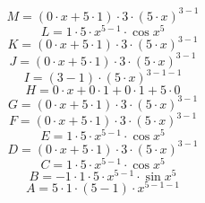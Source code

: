 \documentclass[12pt]{article}
\begin{document}
\begin{equation}
	M = 
\left( 0\cdot x + 5\cdot 1\right) \cdot 3\cdot \left( 5\cdot x\right) ^{3 - 1}
\end{equation}
\begin{equation}
	L = 
1\cdot 5\cdot x^{5 - 1}\cdot \cos {x^{5}}
\end{equation}
\begin{equation}
	K = 
\left( 0\cdot x + 5\cdot 1\right) \cdot 3\cdot \left( 5\cdot x\right) ^{3 - 1}
\end{equation}
\begin{equation}
	J = 
\left( 0\cdot x + 5\cdot 1\right) \cdot 3\cdot \left( 5\cdot x\right) ^{3 - 1}
\end{equation}
\begin{equation}
	I = 
\left( 3 - 1\right) \cdot \left( 5\cdot x\right) ^{3 - 1 - 1}
\end{equation}
\begin{equation}
	H = 
0\cdot x + 0\cdot 1 + 0\cdot 1 + 5\cdot 0
\end{equation}
\begin{equation}
	G = 
\left( 0\cdot x + 5\cdot 1\right) \cdot 3\cdot \left( 5\cdot x\right) ^{3 - 1}
\end{equation}
\begin{equation}
	F = 
\left( 0\cdot x + 5\cdot 1\right) \cdot 3\cdot \left( 5\cdot x\right) ^{3 - 1}
\end{equation}
\begin{equation}
	E = 
1\cdot 5\cdot x^{5 - 1}\cdot \cos {x^{5}}
\end{equation}
\begin{equation}
	D = 
\left( 0\cdot x + 5\cdot 1\right) \cdot 3\cdot \left( 5\cdot x\right) ^{3 - 1}
\end{equation}
\begin{equation}
	C = 
1\cdot 5\cdot x^{5 - 1}\cdot \cos {x^{5}}
\end{equation}
\begin{equation}
	B = 
-1\cdot 1\cdot 5\cdot x^{5 - 1}\cdot \sin {x^{5}}
\end{equation}
\begin{equation}
	A = 
5\cdot 1\cdot \left( 5 - 1\right) \cdot x^{5 - 1 - 1}
\end{equation}
\end{document}
